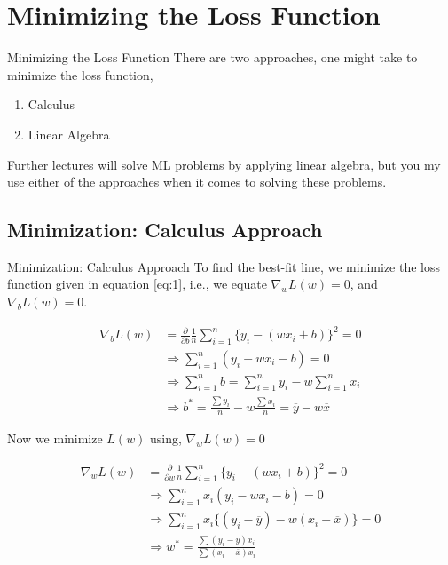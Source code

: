 \documentclass[pdf]{beamer}
\begin{document}
    \section{Minimizing the Loss Function}
    \begin{frame}{Minimizing the Loss Function}
        There are two approaches, one might take to minimize the loss function,

        \begin{enumerate}
            \item Calculus
            \item Linear Algebra
        \end{enumerate}

        Further lectures will solve ML problems by applying linear algebra, but you my use either of the approaches when it comes to solving these problems.
    \end{frame}

    \subsection{Minimization: Calculus Approach}
    \begin{frame}{Minimization: Calculus Approach}
        To find the best-fit line, we minimize the loss function given in equation \eqref{eq:1}, i.e., we equate \(\nabla_wL(w)=0\), and \(\nabla _b L(w)=0\).

        \begin{align}
            \nabla_bL(w)&=\frac{\partial}{\partial b}\frac{1}{n}\sum_{i=1}^n{\{y_i-(wx_i+b)\}^2}=0 \nonumber\\
            &\Rightarrow \sum_{i=1}^n(y_i-wx_i-b)=0 \nonumber\\
            &\Rightarrow \sum_{i=1}^nb=\sum_{i=1}^ny_i-w\sum_{i=1}^nx_i\nonumber\\
            &\Rightarrow \boxed{b^*=\frac{\sum y_i}{n}-w\frac{\sum x_i}{n}=\overline{y}-w\overline{x}}\label{eq:2}
        \end{align}
    \end{frame}

    \begin{frame}
        Now we minimize \(L(w)\) using, \(\nabla_w L(w)=0\)

        \begin{align}
            \nabla_wL(w)&=\frac{\partial}{\partial w}\frac{1}{n}\sum_{i=1}^n{\{y_i-(wx_i+b)\}^2}=0 \nonumber\\
            &\Rightarrow \sum_{i=1}^nx_i(y_i-wx_i-b)=0 \nonumber\\
            &\Rightarrow\sum_{i=1}^nx_i\{(y_i-\overline{y})-w(x_i-\overline{x})\}=0\nonumber\\
            &\Rightarrow\boxed{w^*=\frac{\sum(y_i-\overline{y})x_i}{\sum(x_i-\overline{x})x_i}}\label{eq:3}
        \end{align}
    \end{frame}
\end{document}
